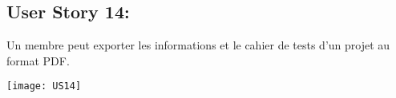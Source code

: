 \newpage{}
\subsection{User Story 14:}
Un membre peut exporter les informations et le cahier de tests d'un projet au format PDF.


  \begin{center}
        \texttt{[image: US14]}
  \end{center}